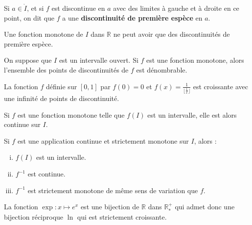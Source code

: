 	
	\begin{definition}
		Si $a \in \mathring{I}$, et si $f$ est discontinue en $a$ avec des limites à gauche et à droite en ce point, on dit que $f$ a une \textbf{discontinuité de première espèce} en $a$.
	\end{definition}
	
	\begin{proposition}
		Une fonction monotone de $I$ dans $\mathbb{R}$ ne peut avoir que des discontinuités de première espèce.
	\end{proposition}
	
	\begin{theorem}
		On suppose que $I$ est un intervalle ouvert. Si $f$ est une fonction monotone, alors l'ensemble des points de discontinuités de $f$ est dénombrable.
	\end{theorem}
	
	\begin{example}
		La fonction $f$ définie sur $[0,1]$ par $f(0) = 0$ et $f(x) = \frac{1}{\lfloor \frac{1}{x} \rfloor}$ est croissante avec une infinité de points de discontinuité.
	\end{example}
	
	
	\begin{proposition}
		Si $f$ est une fonction monotone telle que $f(I)$ est un intervalle, elle est alors continue sur $I$.
	\end{proposition}
	
	\begin{theorem}[Bijection]
		Si $f$ est une application continue et strictement monotone sur $I$, alors :
		\begin{enumerate}[(i)]
			\item $f(I)$ est un intervalle.
			\item $f^{-1}$ est continue.
			\item $f^{-1}$ est strictement monotone de même sens de variation que $f$.
		\end{enumerate}
	\end{theorem}
	
	\begin{example}
		La fonction $\exp : x \mapsto e^x$ est une bijection de $\mathbb{R}$ dans $\mathbb{R}^{+}_{*}$ qui admet donc une bijection réciproque $\ln$ qui est strictement croissante.
	\end{example}
	
	
